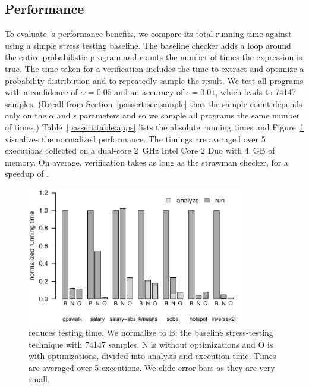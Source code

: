 \subsection{Performance}

To evaluate \tool's performance benefits,
we compare its total running time against
using a simple stress testing baseline.
The baseline checker adds a  loop around the entire
probabilistic program and counts the number of times the \passert expression
is true.
The time taken for a \tool verification includes the time to extract and
optimize a probability distribution and to repeatedly sample the
result.
We test all programs with a confidence of $\alpha = 0.05$ and an
accuracy of $\epsilon = 0.01$, which leads to 74147 samples.
(Recall from Section~\ref{passert:sec:sample} that the sample count depends only on the
$\alpha$ and $\epsilon$ parameters and 
 so we sample all programs the
same number of times.)
Table~\ref{passert:table:apps} lists the absolute running times and
Figure~\ref{passert:fig:performance} visualizes the normalized performance.
The timings are averaged over 5 executions collected on a dual-core 2~GHz
Intel Core 2 Duo with 4~GB of memory.
On average, \tool verification takes  as
long as the strawman checker, for a speedup of
.


\begin{figure}
    \centering
    \includegraphics[width=9.5cm]{results/performance}
    \vspace{-1ex}
    \caption{\tool reduces testing time.  We normalize to B: the baseline
      stress-testing technique with 74147 samples. N is \tool without 
      optimizations and O is \tool with optimizations, divided into
      analysis and execution time. Times are averaged over 5 executions.
      We elide error bars as they are very small.}
    \label{passert:fig:performance}
\end{figure}

